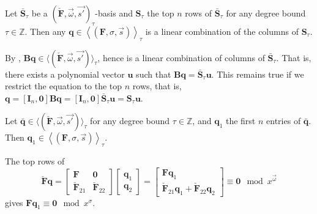 \begin{cor}
\label{cor:linearCombinationOfFirstnRows}Let $\bar{\mathbf{S}}_{\tau}$
be a $(\check{\mathbf{F}},\vec{\omega},\vec{s'})_{\tau}$-basis and
$\mathbf{S}_{\tau}$ the top $n$ rows of $\bar{\mathbf{S}}_{\tau}$
for any degree bound $\tau\in\mathbb{Z}$. Then any $\mathbf{q}\in\left\langle \left(\mathbf{F},\sigma,\vec{s}\right)\right\rangle _{\tau}$
is a linear combination of the columns of $\mathbf{S}_{\tau}$.\end{cor}
\begin{pf}
By , $\mathbf{B}\mathbf{q}\in\langle(\check{\mathbf{F}},\vec{\omega},\vec{s'})\rangle_{\tau}$,
hence is a linear combination of columns of $\bar{\mathbf{S}}_{\tau}$.
That is, there exists a polynomial vector $\mathbf{u}$ such that
$\mathbf{B}\mathbf{q}=\bar{\mathbf{S}}_{\tau}\mathbf{u}$. This remains
true if we restrict the equation to the top $n$ rows, that is, $\mathbf{q}=\left[\mathbf{I}_{n},\mathbf{0}\right]\mathbf{B}\mathbf{q}=\left[\mathbf{I}_{n},\mathbf{0}\right]\bar{\mathbf{S}}_{\tau}\mathbf{u}=\mathbf{S}_{\tau}\mathbf{u}$.\end{pf}
\begin{lem}
\label{lem:bqToqOrder}Let $\bar{\mathbf{q}}\in\langle(\check{\mathbf{F}},\vec{\omega},\vec{s'})\rangle_{\tau}$
for any degree bound $\tau\in\mathbb{Z}$, and $\mathbf{q}_{1}$ the
first $n$ entries of $\mathbf{\bar{q}}$. Then $\mathbf{q}_{1}\in\left\langle \left(\mathbf{F},\sigma,\vec{s}\right)\right\rangle _{\tau}$.\end{lem}
\begin{pf}
The top rows of \[
\check{\mathbf{F}}\mathbf{q}=\left[\begin{array}{cc}
\mathbf{F} & \mathbf{0}\\
\check{\mathbf{F}}_{21} & \check{\mathbf{F}}_{22}\end{array}\right]\left[\begin{array}{c}
\mathbf{q}_{1}\\
\mathbf{q}_{2}\end{array}\right]=\begin{bmatrix}\mathbf{F}\mathbf{q}_{1}\\
\check{\mathbf{F}}_{21}\mathbf{q}_{1}+\check{\mathbf{F}}_{22}\mathbf{q}_{2}\end{bmatrix}\equiv\mathbf{0}\mod x^{\vec{\omega}}\]
 gives $\mathbf{F}\mathbf{q}_{1}\equiv\mathbf{0}\mod x^{\sigma}$.\end{pf}

